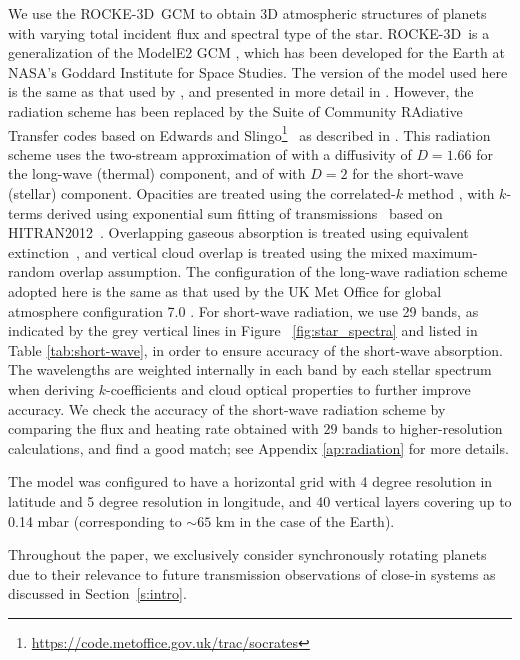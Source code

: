 \documentclass[11pt,numberedappendix,twocolappendix,]{emulateapj}
\def\modelE{ROCKE-3D}
\begin{document}
We use the \modelE \ GCM \citep{Way2017} to obtain 3D atmospheric structures of planets with varying total incident flux and spectral type of the star. 
\modelE \ is a generalization of the ModelE2 GCM \citep{Schmidt2014}, which has been developed for the Earth at NASA's Goddard Institute for Space Studies. 
%
The version of the model used here is the same as that used by \citet{Way2016}, and presented in more detail in \citet{Way2017}.
However, the radiation scheme has been replaced by the Suite of Community RAdiative Transfer codes based on Edwards and Slingo\footnote{\url{https://code.metoffice.gov.uk/trac/socrates}}~\citep[SOCRATES,][]{EdwardsSlingo1996,Edwards1996} as described in \citet{Way2017}. 
This radiation scheme uses the two-stream approximation of \citet{Zdunkowski1985} with a diffusivity of $D=1.66$ for the long-wave (thermal) component, and of \citet{Zdunkowski1980} with $D=2$ for the short-wave (stellar) component. 
Opacities are treated using 
the correlated-$k$ method \citep{Lacis1991,Goody1989}, with $k$-terms derived using exponential sum fitting of transmissions~\citep{Wiscombe1977} based on HITRAN2012~\citep{Rothman2013}. 
Overlapping gaseous absorption is treated using equivalent extinction~\citep{Edwards1996,Amundsen2016}, and vertical cloud overlap is treated using the mixed maximum-random overlap assumption.
The configuration of the long-wave radiation scheme adopted here is the same as that used by the UK Met Office for global atmosphere configuration 7.0 \citep[GA7.0;][]{Walters2017}. 
For short-wave radiation, we use 29 bands, as indicated by the grey vertical lines in Figure ~\ref{fig:star_spectra} and listed in Table \ref{tab:short-wave}, in order to ensure accuracy of the short-wave absorption. 
The wavelengths are weighted internally in each band by each stellar spectrum when deriving $k$-coefficients and cloud optical properties to further improve accuracy. 
We check the accuracy of the short-wave radiation scheme by comparing the flux and heating rate obtained with $29$ bands to higher-resolution calculations, and find a good match; see Appendix \ref{ap:radiation} for more details. 

The model was configured to have a horizontal grid with 4 degree resolution in latitude and 5 degree resolution in longitude, and 40 vertical layers covering up to 0.14 mbar (corresponding to $\sim 65$ km in the case of the Earth). 

Throughout the paper, we exclusively consider synchronously rotating planets due to their relevance to future transmission observations of close-in systems as discussed in Section~\ref{s:intro}. 
\end{document}
